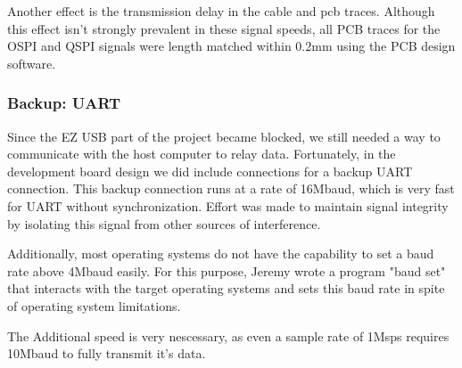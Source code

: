 	Another effect is the transmission delay in the cable and pcb traces. Although this effect isn't strongly prevalent in these signal speeds, all PCB traces for the OSPI and QSPI signals were length matched within 0.2mm using the PCB design software.
	
	\subsubsection{Backup: UART}
	Since the EZ USB part of the project became blocked, we still needed a way to communicate with the host computer to relay data. Fortunately, in the development board design we did include connections for a backup UART connection. This backup connection runs at a rate of 16Mbaud, which is very fast for UART without synchronization. Effort was made to maintain signal integrity by isolating this signal from other sources of interference. 
	
	Additionally, most operating systems do not have the capability to set a baud rate above 4Mbaud easily. For this purpose, Jeremy wrote a program "baud set" that interacts with the target operating systems and sets this baud rate in spite of operating system limitations.
	
	The Additional speed is very nescessary, as even a sample rate of 1Msps requires 10Mbaud to fully transmit it's data.
	